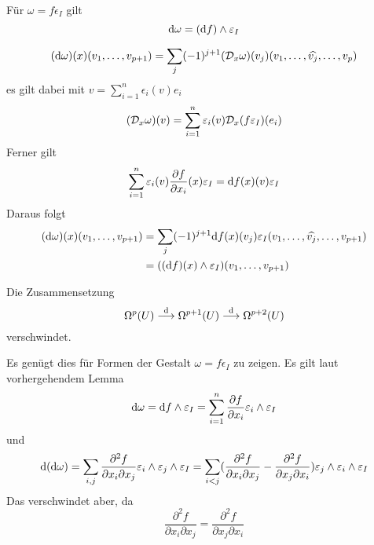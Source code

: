 \Lem{}
Für $\omega = f \epsilon_I$ gilt
\[ \text{d} \omega = (\text{d} f) \wedge \varepsilon_I \]
\begin{Beweis}{}
\[ (\text{d} \omega)(x)(v_1, \ldots, v_{p+1}) = \sum_{j} (-1)^{j+1} (\mathcal{D}_x \omega) (v_j) (v_1, \ldots, \widehat{v_j}, \ldots, v_p) \]
es gilt dabei mit $v = \sum_{i= 1}^{n} \epsilon_i(v) e_i$
\[ (\mathcal{D}_x \omega)(v) = \sum_{i= 1}^{n} \varepsilon_i(v) \mathcal{D}_x(f\varepsilon_I)(e_i) \]
Ferner gilt
\[ \sum_{i= 1}^{n} \varepsilon_i(v)\frac{\partial f}{\partial x_i}(x) \varepsilon_I = \text{d} f(x)(v) \varepsilon_I \]
Daraus folgt
\begin{align*}
 (\text{d} \omega) (x) (v_1, \ldots, v_{p+1}) &= \sum_{j} (-1)^{j+1} \text{d} f(x) (v_j)  \varepsilon_I(v_1, \ldots, \widehat{v_j}, \ldots, v_{p+1}) \\
 &= ( (\text{d} f) (x) \wedge \varepsilon_I) (v_1, \ldots, v_{p+1}) 
\end{align*}
\end{Beweis}

\Lem{}
Die Zusammensetzung
\[ \Omega^p(U) \overset{\text{d}}{\longrightarrow} \Omega^{p+1}(U) \overset{ \text{d} }{\longrightarrow} \Omega^{p+2}(U) \]
verschwindet.
\begin{Beweis}{}
Es genügt dies für Formen der Gestalt $\omega = f\epsilon_I$ zu zeigen. Es gilt laut vorhergehendem Lemma
\[ \text{d} \omega = \text{d} f \wedge \varepsilon_I = \sum_{i = 1}^n \frac{\partial f}{\partial x_i} \varepsilon_i \wedge \varepsilon_I \]
und
\[ \text{d} (\text{d} \omega) = \sum_{i,j} \frac{\partial^2 f}{\partial x_i \partial x_j} \varepsilon_i \wedge \varepsilon_j \wedge \varepsilon_I
= \sum_{i<j} ( \frac{\partial^2 f}{\partial x_i \partial x_j} - \frac{\partial^2 f}{\partial x_j \partial x_i}) \varepsilon_j\wedge \varepsilon_i \wedge \varepsilon_I
 \]
 Das verschwindet aber, da
 \[\frac{\partial^2 f}{\partial x_i \partial x_j} = \frac{\partial^2 f}{\partial x_j \partial x_i}\]
\end{Beweis}